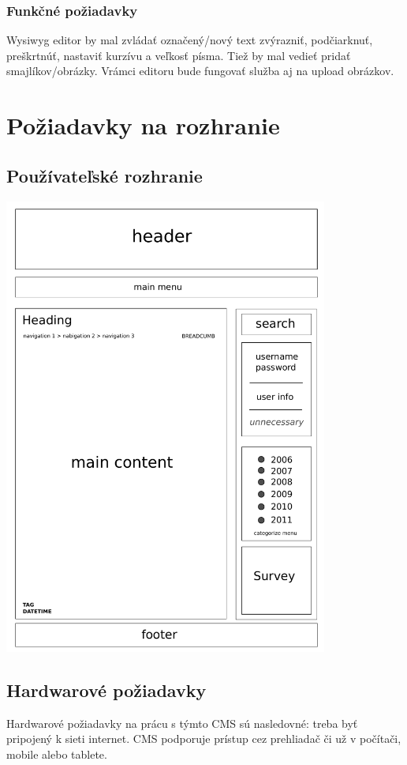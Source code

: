 \documentclass[a4paper,titlepage,11pt]{article}
\begin{document}
\subsubsection{Funkčné požiadavky}
Wysiwyg editor by mal zvládať označený\slash nový text zvýrazniť, podčiarknuť, preškrtnúť, nastaviť kurzívu a veľkosť písma. 
Tiež by mal vedieť pridať smajlíkov\slash obrázky. Vrámci editoru bude fungovať služba aj na upload obrázkov.

\newpage
\section{Požiadavky na rozhranie}
\subsection{Používateľské rozhranie}
\includegraphics[width=0.8\textwidth]{user_interface.pdf}

\subsection{Hardwarové požiadavky}
Hardwarové požiadavky na prácu s týmto CMS sú nasledovné: treba byť pripojený k sieti internet. 
CMS podporuje prístup cez prehliadač či už v počítači, mobile alebo tablete. 
\end{document}
